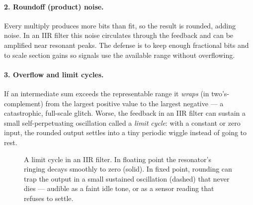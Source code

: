 \paragraph{2. Roundoff (product) noise.} Every multiply produces more bits than
fit, so the result is rounded, adding noise. In an IIR filter this noise
circulates through the feedback and can be amplified near resonant peaks. The
defense is to keep enough fractional bits and to scale section gains so signals
use the available range without overflowing.

\paragraph{3. Overflow and limit cycles.} If an intermediate sum exceeds the
representable range it \emph{wraps} (in two's-complement) from the largest
positive value to the largest negative --- a catastrophic, full-scale glitch.
Worse, the feedback in an IIR filter can sustain a small self-perpetuating
oscillation called a \emph{limit cycle}: with a constant or zero input, the
rounded output settles into a tiny periodic wiggle instead of going to rest.

\begin{figure}[H]
\centering
{}
\caption{A limit cycle in an IIR filter. In floating point the resonator's
ringing decays smoothly to zero (solid). In fixed point, rounding can trap the
output in a small sustained oscillation (dashed) that never dies --- audible as
a faint idle tone, or as a sensor reading that refuses to settle.}
\label{ch17:fig-limitcycle}
\end{figure}

